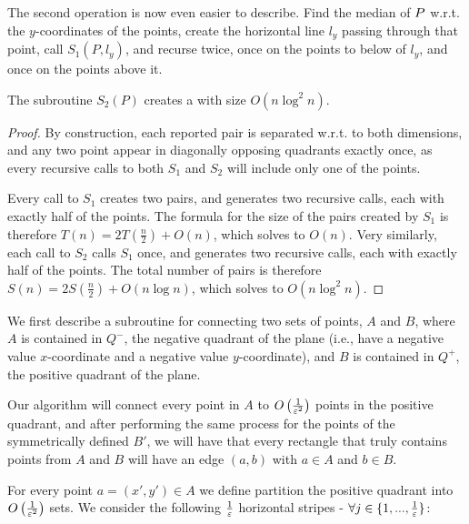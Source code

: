 \documentclass[12pt]{article}%
\begin{document}
The second operation is now even easier to describe. Find the median
of $P$ w.r.t. the $y$-coordinates of the points, create the
horizontal line $l_y$ passing through that point, call $S_1(P,l_y)$,
and recurse twice, once on the points to below of $l_y$, and once on
the points above it.

\begin{claim}
    The subroutine $S_2(P)$ creates a \QSPD with size $O(n\log^2n)$.
\end{claim}

\begin{proof}
    By construction, each reported pair is separated w.r.t. to both
    dimensions, and any two point appear in diagonally opposing
    quadrants exactly once, as every recursive calls to both $S_1$ and
    $S_2$ will include only one of the points.
    
    Every call to $S_1$ creates two pairs, and generates two recursive
    calls, each with exactly half of the points. The formula for the
    size of the pairs created by $S_1$ is therefore
    $T(n)=2T\left( \frac{n}{2}\right) + O(n)$, which solves to
    $O(n)$. Very similarly, each call to $S_2$ calls $S_1$ once, and
    generates two recursive calls, each with exactly half of the
    points. The total number of pairs is therefore
    $S(n)=2S\left( \frac{n}{2}\right) + O(n\log n)$, which solves to
    $O(n\log^2n)$.
    
\end{proof}






We first describe a subroutine for connecting two sets of points, $A$
and $B$, where $A$ is contained in $Q^-$, the negative quadrant of the
plane (i.e., have a negative value $x$-coordinate and a negative value
$y$-coordinate), and $B$ is contained in $Q^+$, the positive quadrant
of the plane.

Our algorithm will connect every point in $A$ to
$O\left(\frac{1}{\varepsilon^2}\right)$ points in the positive quadrant, and
after performing the same process for the points of the symmetrically
defined $B'$, we will have that every rectangle that truly contains
points from $A$ and $B$ will have an edge $(a,b)$ with $a\in A$ and
$b\in B$.

For every point $a = (x',y') \in A$ we define partition the positive
quadrant into $O\left(\frac{1}{\varepsilon^2}\right)$ sets. We consider the
following $\frac{1}{\varepsilon}$ horizontal stripes -
$\forall j\in \{1,...,\frac{1}{\varepsilon}\}$:
\end{document}

